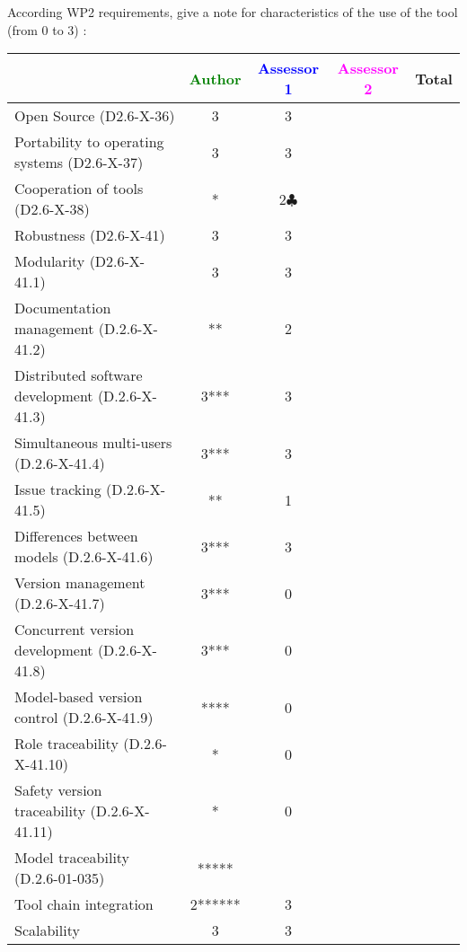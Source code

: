 According WP2 requirements, give a note for characteristics of the use of the tool (from 0 to 3) :

\begin{tabular}{|l | c | c | c | c|}
\hline
& \textcolor{green}{Author} & \textcolor{blue}{Assessor 1} & \textcolor{magenta}{Assessor 2} & Total \\
\hline
Open Source (D2.6-X-36) &3 &3 & & \\
\hline
Portability to operating systems (D2.6-X-37) &3 &3 & & \\
\hline
Cooperation of tools (D2.6-X-38) &* &2$\clubsuit$ & & \\
\hline
Robustness (D2.6-X-41) &3 &3 & & \\
\hline
Modularity (D2.6-X-41.1) &3 &3 & & \\
\hline
Documentation management (D.2.6-X-41.2) &** &2 & & \\
\hline
Distributed software development (D.2.6-X-41.3) &3*** &3 & & \\
\hline
Simultaneous multi-users (D.2.6-X-41.4) &3*** & 3& & \\
\hline
Issue tracking (D.2.6-X-41.5) &** &1 & & \\
\hline
Differences between models (D.2.6-X-41.6) &3*** &3 & & \\
\hline
Version management (D.2.6-X-41.7) &3*** &0 & & \\
\hline
Concurrent version development (D.2.6-X-41.8) &3*** &0 & & \\
\hline
Model-based version control (D.2.6-X-41.9) &**** &0 & & \\
\hline
Role traceability (D.2.6-X-41.10) &* &0 & & \\
\hline
Safety version traceability (D.2.6-X-41.11) &* &0 & & \\
\hline
Model traceability (D.2.6-01-035) &***** & & & \\
\hline
Tool chain integration &2****** &3 & & \\
\hline
Scalability &3 &3 & & \\
\hline
\end{tabular}

